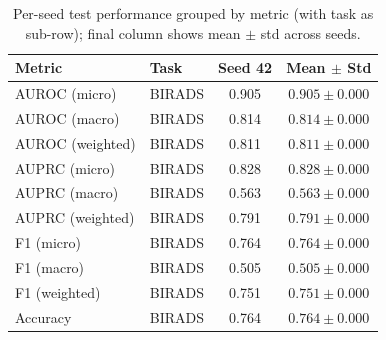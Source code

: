 \begin{table}[h]
\centering
\small
\begin{tabular}{ll|c|c}
\hline
Metric & Task & Seed 42 & Mean $\pm$ Std \\
\hline
AUROC (micro) & BIRADS & 0.905 & $0.905 \pm 0.000$ \\
\hline
AUROC (macro) & BIRADS & 0.814 & $0.814 \pm 0.000$ \\
\hline
AUROC (weighted) & BIRADS & 0.811 & $0.811 \pm 0.000$ \\
\hline
AUPRC (micro) & BIRADS & 0.828 & $0.828 \pm 0.000$ \\
\hline
AUPRC (macro) & BIRADS & 0.563 & $0.563 \pm 0.000$ \\
\hline
AUPRC (weighted) & BIRADS & 0.791 & $0.791 \pm 0.000$ \\
\hline
F1 (micro) & BIRADS & 0.764 & $0.764 \pm 0.000$ \\
\hline
F1 (macro) & BIRADS & 0.505 & $0.505 \pm 0.000$ \\
\hline
F1 (weighted) & BIRADS & 0.751 & $0.751 \pm 0.000$ \\
\hline
Accuracy & BIRADS & 0.764 & $0.764 \pm 0.000$ \\
\hline
\end{tabular}
\caption{Per-seed test performance grouped by metric (with task as sub-row); final column shows mean $\pm$ std across seeds.}
\end{table}
